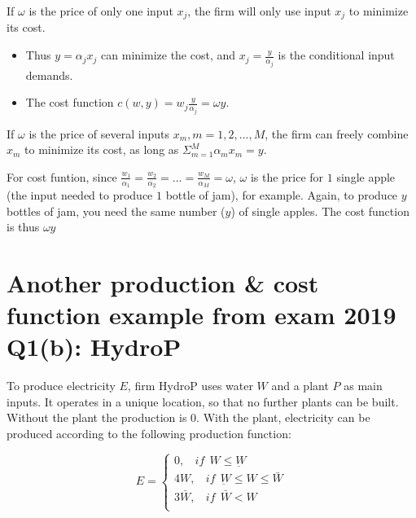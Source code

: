 \documentclass{article}
\begin{document}
\vspace{2mm}

If $\omega$ is the price of only one input $x_j$, the firm will only use input $x_j$ to minimize its cost. 

\begin{itemize}
\item Thus $y = \alpha_j x_j$ can minimize the cost, and $x_j = \frac{y}{\alpha_j}$ is the conditional input demands.
\item The cost function $c(w,y) = w_j \frac{y}{\alpha_j} = \omega y$.
\end{itemize}


If $\omega$ is the price of several inputs $x_m, m = 1,2, \dots, M$, the firm can freely combine $x_m$ to minimize its cost, as long as  $\Sigma^M_{m=1} \alpha_m x_m = y$.

\vspace{2mm}

For cost funtion, since $\frac{w_1}{\alpha_1} = \frac{w_2}{\alpha_2}= \dots =\frac{w_M}{\alpha_M} = \omega$, $\omega$ is the price for $1$ single apple (the input needed to produce $1$ bottle of jam), for example. Again, to produce $y$ bottles of jam, you need the same number ($y$) of single apples. The cost function is thus $\omega y$

\section{Another production \& cost function example from exam 2019 Q1(b): HydroP}

To produce electricity $E$, firm HydroP uses water $W$ and a plant $P$ as
main inputs. It operates in a unique location, so that no further plants can be
built. Without the plant the production is $0$. With the plant, electricity can be
produced according to the following production function:


\begin{equation}
E=
    \begin{cases}
0, \ \ \ \ if \ \ W \le \underbar{W} \\
4W, \ \ \ \ if \ \   \underbar{W} \le   W \le \bar{W} \\
3\bar{W}, \ \ \ \ if \ \ \bar{W} < W \\
    \end{cases}
    \label{eq:hydro}   
\end{equation}
\end{document}
